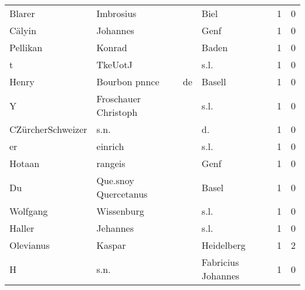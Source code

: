 \begin{tabular}{llllrr}
                   Blarer &                          Imbrosius &             &                                        Biel &          1 &         0 \\
                   Cälyin &                           Johannes &             &                                        Genf &          1 &         0 \\
                 Pellikan &                             Konrad &             &                                       Baden &          1 &         0 \\
                        t &                            TkeUotJ &             &                                        s.l. &          1 &         0 \\
                    Henry &                      Bourbon pnnce &          de &                                      Basell &          1 &         0 \\
                        Y &               Froschauer Christoph &             &                                        s.l. &          1 &         0 \\
        CZürcherSchweizer &                               s.n. &             &                                         d.  &          1 &         0 \\
                       er &                            einrich &             &                                        s.l. &          1 &         0 \\
                   Hotaan &                            rangeis &             &                                        Genf &          1 &         0 \\
                       Du &               Que.snoy Quercetanus &             &                                       Basel &          1 &         0 \\
                 Wolfgang &                         Wissenburg &             &                                        s.l. &          1 &         0 \\
                   Haller &                           Jehannes &             &                                        s.l. &          1 &         0 \\
                Olevianus &                             Kaspar &             &                                  Heidelberg &          1 &         2 \\
                        H &                               s.n. &             &                          Fabricius Johannes &          1 &         0 \\

\end{tabular}
